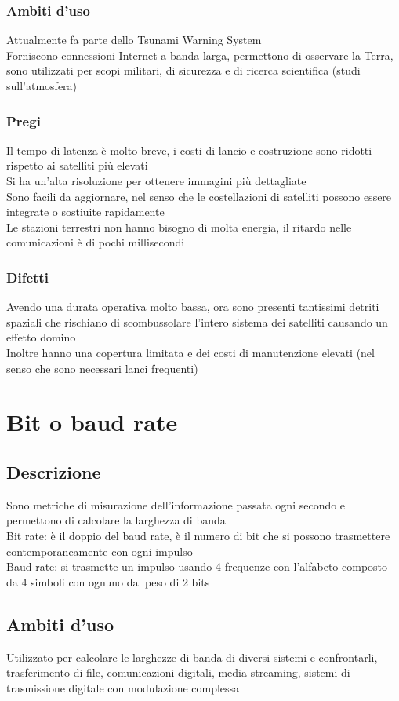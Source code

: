 \documentclass[10pt,oneside,a4paper]{article}
\begin{document}
\subsubsection{Ambiti d'uso}
Attualmente fa parte dello Tsunami Warning System\\
Forniscono connessioni Internet a banda larga, permettono di osservare la Terra, sono utilizzati per scopi militari, di sicurezza e di ricerca scientifica (studi sull'atmosfera)
\subsubsection{Pregi}
Il tempo di latenza è molto breve, i costi di lancio e costruzione sono ridotti rispetto ai satelliti più elevati\\
Si ha un'alta risoluzione per ottenere immagini più dettagliate\\
Sono facili da aggiornare, nel senso che le costellazioni di satelliti possono essere integrate o sostiuite rapidamente\\
Le stazioni terrestri non hanno bisogno di molta energia, il ritardo nelle comunicazioni è di pochi millisecondi
\subsubsection{Difetti}
Avendo una durata operativa molto bassa, ora sono presenti tantissimi detriti spaziali che rischiano di scombussolare l'intero sistema dei satelliti causando un effetto domino\\
Inoltre hanno una copertura limitata e dei costi di manutenzione elevati (nel senso che sono necessari lanci frequenti)
\section{Bit o baud rate}
\subsection{Descrizione}
Sono metriche di misurazione dell'informazione passata ogni secondo e permettono di calcolare la larghezza di banda\\
Bit rate: è il doppio del baud rate, è il numero di bit che si possono trasmettere contemporaneamente con ogni impulso\\
Baud rate: si trasmette un impulso usando 4 frequenze con l'alfabeto composto da 4 simboli con ognuno dal peso di 2 bits
\subsection{Ambiti d'uso}
Utilizzato per calcolare le larghezze di banda di diversi sistemi e confrontarli, trasferimento di file, comunicazioni digitali, media streaming, sistemi di trasmissione digitale con modulazione complessa
\end{document}
